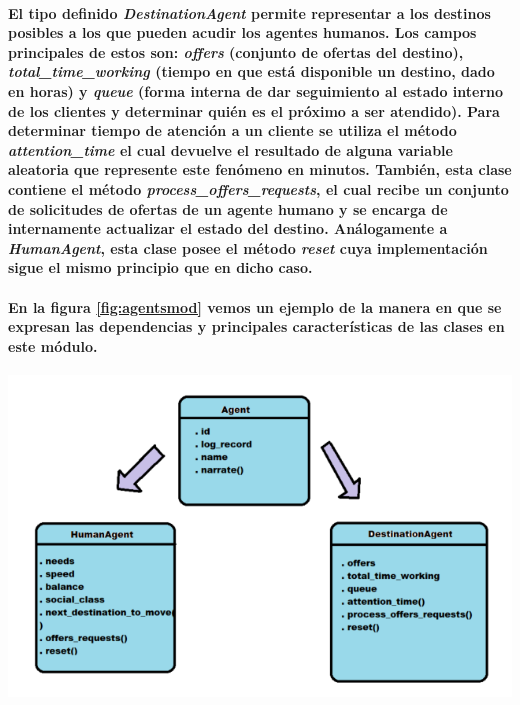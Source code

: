 \documentclass[12pt]{amsart}
\begin{document}
\paragraph{El tipo definido \textit{DestinationAgent} permite representar a los destinos posibles a los que pueden acudir los agentes humanos. Los campos principales de estos son: \textit{offers} (conjunto de ofertas del destino), \textit{total\_time\_working} (tiempo en que está disponible un destino, dado en horas) y \textit{queue} (forma interna de dar seguimiento al estado interno de los clientes y determinar quién es el próximo a ser atendido). Para determinar tiempo de atención a un cliente se utiliza el método \textit{attention\_time} el cual devuelve el resultado de alguna variable aleatoria que represente este fenómeno en minutos. También, esta clase contiene el método \textit{process\_offers\_requests}, el cual recibe un conjunto de solicitudes de ofertas de un agente humano y se encarga de internamente actualizar el estado del destino. Análogamente a \textit{HumanAgent}, esta clase posee el método \textit{reset} cuya implementación sigue el mismo principio que en dicho caso.}

\paragraph{En la figura \ref{fig:agentsmod} vemos un ejemplo de la manera en que se expresan las dependencias y principales características de las clases en este módulo.}

\begin{center}
	\includegraphics[scale=0.8]{./images/agentsmod.png}
	\label{fig:agentsmod}
\end{center}
\end{document}
